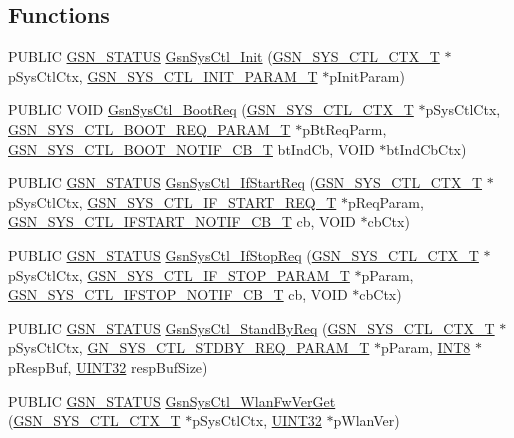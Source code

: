 \subsection*{Functions}
\begin{DoxyCompactItemize}
\item 
PUBLIC \hyperlink{a00660_gada5951904ac6110b1fa95e51a9ddc217}{GSN\_\-STATUS} \hyperlink{a00592_a47b7b79009cf8a133258730042bc8ec6}{GsnSysCtl\_\-Init} (\hyperlink{a00248}{GSN\_\-SYS\_\-CTL\_\-CTX\_\-T} $\ast$pSysCtlCtx, \hyperlink{a00249}{GSN\_\-SYS\_\-CTL\_\-INIT\_\-PARAM\_\-T} $\ast$pInitParam)
\item 
PUBLIC VOID \hyperlink{a00592_a8f967faa8740579515b92d3fe6cccf8d}{GsnSysCtl\_\-BootReq} (\hyperlink{a00248}{GSN\_\-SYS\_\-CTL\_\-CTX\_\-T} $\ast$pSysCtlCtx, \hyperlink{a00247}{GSN\_\-SYS\_\-CTL\_\-BOOT\_\-REQ\_\-PARAM\_\-T} $\ast$pBtReqParm, \hyperlink{a00592_a0000f73c2f639831f9499e5106c70b4f}{GSN\_\-SYS\_\-CTL\_\-BOOT\_\-NOTIF\_\-CB\_\-T} btIndCb, VOID $\ast$btIndCbCtx)
\item 
PUBLIC \hyperlink{a00660_gada5951904ac6110b1fa95e51a9ddc217}{GSN\_\-STATUS} \hyperlink{a00592_afaa471eba52b8b07eaff53e5dfea4954}{GsnSysCtl\_\-IfStartReq} (\hyperlink{a00248}{GSN\_\-SYS\_\-CTL\_\-CTX\_\-T} $\ast$pSysCtlCtx, \hyperlink{a00353}{GSN\_\-SYS\_\-CTL\_\-IF\_\-START\_\-REQ\_\-T} $\ast$pReqParam, \hyperlink{a00592_a2378a15a57410fa717b24a73398855f4}{GSN\_\-SYS\_\-CTL\_\-IFSTART\_\-NOTIF\_\-CB\_\-T} cb, VOID $\ast$cbCtx)
\item 
PUBLIC \hyperlink{a00660_gada5951904ac6110b1fa95e51a9ddc217}{GSN\_\-STATUS} \hyperlink{a00592_ab50c4dd705f651bb6156b9152817eb2f}{GsnSysCtl\_\-IfStopReq} (\hyperlink{a00248}{GSN\_\-SYS\_\-CTL\_\-CTX\_\-T} $\ast$pSysCtlCtx, \hyperlink{a00355}{GSN\_\-SYS\_\-CTL\_\-IF\_\-STOP\_\-PARAM\_\-T} $\ast$pParam, \hyperlink{a00592_a04addc1c242f2d0a18d2a1f21b8379b1}{GSN\_\-SYS\_\-CTL\_\-IFSTOP\_\-NOTIF\_\-CB\_\-T} cb, VOID $\ast$cbCtx)
\item 
PUBLIC \hyperlink{a00660_gada5951904ac6110b1fa95e51a9ddc217}{GSN\_\-STATUS} \hyperlink{a00592_a1b2fce560ef79232cde0aa2102ac5a07}{GsnSysCtl\_\-StandByReq} (\hyperlink{a00248}{GSN\_\-SYS\_\-CTL\_\-CTX\_\-T} $\ast$pSysCtlCtx, \hyperlink{a00364}{GN\_\-SYS\_\-CTL\_\-STDBY\_\-REQ\_\-PARAM\_\-T} $\ast$pParam, \hyperlink{a00660_ga307b8734c020247f6bac4fcde0dcfbb9}{INT8} $\ast$pRespBuf, \hyperlink{a00660_gae1e6edbbc26d6fbc71a90190d0266018}{UINT32} respBufSize)
\item 
PUBLIC \hyperlink{a00660_gada5951904ac6110b1fa95e51a9ddc217}{GSN\_\-STATUS} \hyperlink{a00592_a448531c4a49154250e6c6653b9573314}{GsnSysCtl\_\-WlanFwVerGet} (\hyperlink{a00248}{GSN\_\-SYS\_\-CTL\_\-CTX\_\-T} $\ast$pSysCtlCtx, \hyperlink{a00660_gae1e6edbbc26d6fbc71a90190d0266018}{UINT32} $\ast$pWlanVer)

\end{DoxyCompactItemize}
